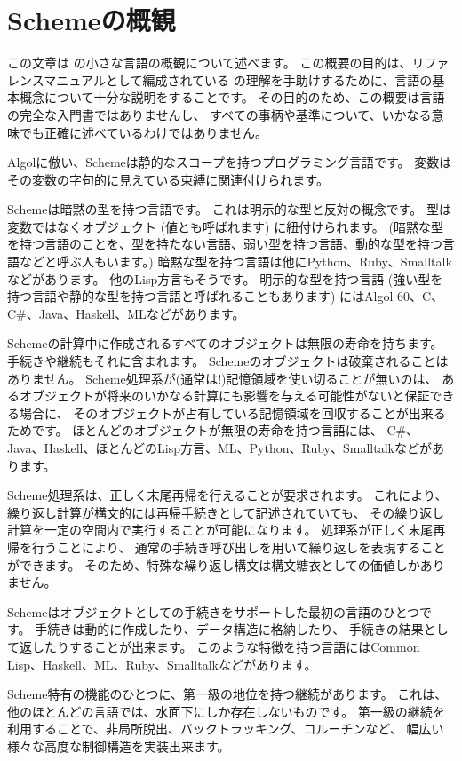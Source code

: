 \chapter*{Schemeの概観}

この文章は \rsevenrs の小さな言語の概観について述べます。
この概要の目的は、リファレンスマニュアルとして編成されている
\rsevenrs{} の理解を手助けするために、言語の基本概念について十分な説明をすることです。
その目的のため、この概要は言語の完全な入門書ではありませんし、
すべての事柄や基準について、いかなる意味でも正確に述べているわけではありません。

\vest Algolに倣い、Schemeは静的なスコープを持つプログラミング言語です。
変数はその変数の字句的に見えている束縛に関連付けられます。

\vest Schemeは暗黙の型を持つ言語です。
これは明示的な型と反対の概念です。
型は変数ではなくオブジェクト (値とも呼ばれます) に紐付けられます。
(暗黙な型を持つ言語のことを、型を持たない言語、弱い型を持つ言語、動的な型を持つ言語などと呼ぶ人もいます。)
暗黙な型を持つ言語は他にPython、Ruby、Smalltalkなどがあります。
他のLisp方言もそうです。
明示的な型を持つ言語
(強い型を持つ言語や静的な型を持つ言語と呼ばれることもあります)
にはAlgol 60、C、C\#、Java、Haskell、MLなどがあります。

\vest Schemeの計算中に作成されるすべてのオブジェクトは無限の寿命を持ちます。
手続きや継続もそれに含まれます。
Schemeのオブジェクトは破棄されることはありません。
Scheme処理系が(通常は!)記憶領域を使い切ることが無いのは、
あるオブジェクトが将来のいかなる計算にも影響を与える可能性がないと保証できる場合に、
そのオブジェクトが占有している記憶領域を回収することが出来るためです。
ほとんどのオブジェクトが無限の寿命を持つ言語には、
C\#、Java、Haskell、ほとんどのLisp方言、ML、Python、Ruby、Smalltalkなどがあります。

Scheme処理系は、正しく末尾再帰を行えることが要求されます。
これにより、繰り返し計算が構文的には再帰手続きとして記述されていても、
その繰り返し計算を一定の空間内で実行することが可能になります。
処理系が正しく末尾再帰を行うことにより、
通常の手続き呼び出しを用いて繰り返しを表現することができます。
そのため、特殊な繰り返し構文は構文糖衣としての価値しかありません。

\vest Schemeはオブジェクトとしての手続きをサポートした最初の言語のひとつです。
手続きは動的に作成したり、データ構造に格納したり、
手続きの結果として返したりすることが出来ます。
このような特徴を持つ言語にはCommon Lisp、Haskell、ML、Ruby、Smalltalkなどがあります。

\vest Scheme特有の機能のひとつに、第一級の地位を持つ継続があります。
これは、他のほとんどの言語では、水面下にしか存在しないものです。
第一級の継続を利用することで、非局所脱出、バックトラッキング、コルーチンなど、
幅広い様々な高度な制御構造を実装出来ます。

